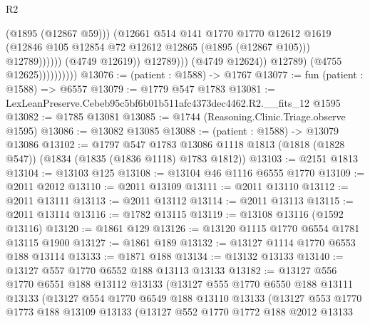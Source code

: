 \begin{lexlean}{R2}
\begin{coremodule}
                                              (@1895 (@12867 @59)))
                                            (@12661
                                              @514
                                              @141
                                              @1770
                                              @1770
                                              @12612
                                              @1619
                                              (@12846
                                                @105
                                                @12854
                                                @72
                                                @12612
                                                @12865
                                                (@1895 (@12867 @105)))
                                              @12789))))))
                                  (@4749 @12619))
                                @12789)))
                          (@4749 @12624))
                        @12789)
                      (@4755 @12625))))))))))
@13076 := (patient : @1588) -> @1767
@13077 := fun (patient : @1588) => @6557
@13079 := @1779 @547 @1783
@13081 := LexLeanPreserve.Cebeb95c5bf6b01b511afc4373dec4462.R2.__fits_12 @1595
@13082 := @1785 @13081
@13085 := @1744 (Reasoning.Clinic.Triage.observe @1595)
@13086 := @13082 @13085
@13088 := (patient : @1588) -> @13079 @13086
@13102 := @1797
    @547
    @1783
    @13086
    @1118
    @1813
    (@1818 (@1828 @547))
    (@1834 (@1835 (@1836 @1118) @1783 @1812))
@13103 := @2151 @1813
@13104 := @13103 @125
@13108 := @13104 @46 @1116 @6555 @1770
@13109 := @2011 @2012
@13110 := @2011 @13109
@13111 := @2011 @13110
@13112 := @2011 @13111
@13113 := @2011 @13112
@13114 := @2011 @13113
@13115 := @2011 @13114
@13116 := @1782 @13115
@13119 := @13108 @13116 (@1592 @13116)
@13120 := @1861 @129
@13126 := @13120 @1115 @1770 @6554 @1781 @13115 @1900
@13127 := @1861 @189
@13132 := @13127 @1114 @1770 @6553 @188 @13114
@13133 := @1871 @188
@13134 := @13132 @13133
@13140 := @13127 @557 @1770 @6552 @188 @13113 @13133
@13182 := @13127
    @556
    @1770
    @6551
    @188
    @13112
    @13133
    (@13127
      @555
      @1770
      @6550
      @188
      @13111
      @13133
      (@13127
        @554
        @1770
        @6549
        @188
        @13110
        @13133
        (@13127
          @553
          @1770
          @1773
          @188
          @13109
          @13133
          (@13127
            @552
            @1770
            @1772
            @188
            @2012
            @13133

\end{coremodule}
\end{lexlean}
